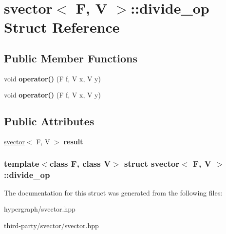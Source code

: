 \hypertarget{structsvector_1_1divide__op}{
\section{svector$<$ F, V $>$::divide\_\-op Struct Reference}
\label{structsvector_1_1divide__op}
}
\subsection*{Public Member Functions}
\begin{DoxyCompactItemize}
\item 
\hypertarget{structsvector_1_1divide__op_a1e6ce70b36862a74b5efaa63208e4b16}{
void {\bfseries operator()} (F f, V x, V y)}
\label{structsvector_1_1divide__op_a1e6ce70b36862a74b5efaa63208e4b16}

\item 
\hypertarget{structsvector_1_1divide__op_a1e6ce70b36862a74b5efaa63208e4b16}{
void {\bfseries operator()} (F f, V x, V y)}
\label{structsvector_1_1divide__op_a1e6ce70b36862a74b5efaa63208e4b16}

\end{DoxyCompactItemize}
\subsection*{Public Attributes}
\begin{DoxyCompactItemize}
\item 
\hypertarget{structsvector_1_1divide__op_a5acd661cb69e5995b87ad9b600871a78}{
\hyperlink{classsvector}{svector}$<$ F, V $>$ {\bfseries result}}
\label{structsvector_1_1divide__op_a5acd661cb69e5995b87ad9b600871a78}

\end{DoxyCompactItemize}
\subsubsection*{template$<$class F, class V$>$ struct svector$<$ F, V $>$::divide\_\-op}



The documentation for this struct was generated from the following files:\begin{DoxyCompactItemize}
\item 
hypergraph/svector.hpp\item 
third-\/party/svector/svector.hpp\end{DoxyCompactItemize}
